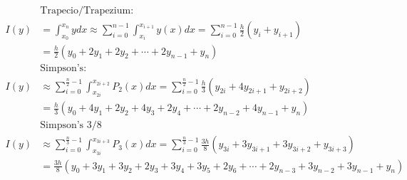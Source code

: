 \begin{align*}
 &\text{Trapecio/Trapezium:}\\
I(y)&=\int_{x_0}^{x_n}ydx \approx \sum_{i=0}^{n-1}\int_{x_i}^{x_{i+1}}y(x)dx=\sum_{i=0}^{n-1}\frac{h}{2}(y_i+y_{i+1})\\
&=\frac{h}{2}\left(y_0+2y_1+2y_2+\cdots+2y_{n-1}+y_n \right)\\
 &\text{Simpson's:} \\
I(y)&\approx \sum_{i=0}^{\frac{n}{2}-1}\int_{x_{2i}}^{x_{2i+2}}P_2(x)dx=\sum_{i=0}^{\frac{n}{2}-1}\frac{h}{3}(y_{2i}+4y_{2i+1}+y_{2i+2})\\
&= \frac{h}{3}(y_0+4y_1+2y_2+4y_3+2y_4+\cdots + 2y_{n-2}+4y_{n-1}+y_n)\\
&\text{Simpson's 3/8}\\
I(y)&\approx \sum_{i=0}^{\frac{n}{3}-1}\int_{x_{3i}}^{x_{3i+3}}P_3(x)dx=\sum_{i=0}^{\frac{n}{3}-1}\frac{3h}{8}(y_{3i}+3y_{3i+1}+3y_{3i+2}+y_{3i+3})\\
&= \frac{3h}{8}(y_0+3y_1+3y_2+2y_3+3y_4+3y_5+2y_6+ \cdots + 2y_{n-3}+3y_{n-2}+3y_{n-1}+y_n)
\end{align*}

